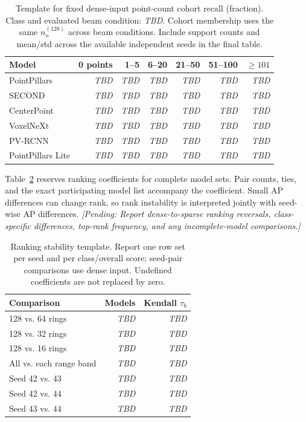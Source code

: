 \documentclass[10pt,twocolumn]{article}
\newcommand{\TBD}{\textit{TBD}}
\newcommand{\pending}[1]{\textcolor{blue!55!black}{\textit{[Pending: #1]}}}
\begin{document}
\begin{table}[t]
\centering\small
\caption{Template for fixed dense-input point-count cohort recall (fraction). Class and evaluated beam condition: \TBD. Cohort membership uses the same $n_o^{(128)}$ across beam conditions. Include support counts and mean/std across the available independent seeds in the final table.}
\label{tab:density-results}
\begin{tabular}{lrrrrrr}
\toprule
Model & 0 points & 1--5 & 6--20 & 21--50 & 51--100 & $\geq101$\\
\midrule
PointPillars & \TBD & \TBD & \TBD & \TBD & \TBD & \TBD\\
SECOND & \TBD & \TBD & \TBD & \TBD & \TBD & \TBD\\
CenterPoint & \TBD & \TBD & \TBD & \TBD & \TBD & \TBD\\
VoxelNeXt & \TBD & \TBD & \TBD & \TBD & \TBD & \TBD\\
PV-RCNN & \TBD & \TBD & \TBD & \TBD & \TBD & \TBD\\
PointPillars Lite & \TBD & \TBD & \TBD & \TBD & \TBD & \TBD\\
\bottomrule
\end{tabular}
\end{table}

Table~\ref{tab:ranking-results} reserves ranking coefficients for complete model sets. Pair counts, ties, and the exact participating model list accompany the coefficient. Small AP differences can change rank, so rank instability is interpreted jointly with seed-wise AP differences. \pending{Report dense-to-sparse ranking reversals, class-specific differences, top-rank frequency, and any incomplete-model comparisons.}

\begin{table}[t]
\centering\small
\caption{Ranking stability template. Report one row set per seed and per class/overall score; seed-pair comparisons use dense input. Undefined coefficients are not replaced by zero.}
\label{tab:ranking-results}
\begin{tabular}{lrr}
\toprule
Comparison & Models & Kendall $\tau_b$\\
\midrule
128 vs. 64 rings & \TBD & \TBD\\
128 vs. 32 rings & \TBD & \TBD\\
128 vs. 16 rings & \TBD & \TBD\\
All vs. each range band & \TBD & \TBD\\
Seed 42 vs. 43 & \TBD & \TBD\\
Seed 42 vs. 44 & \TBD & \TBD\\
Seed 43 vs. 44 & \TBD & \TBD\\
\bottomrule
\end{tabular}
\end{table}
\end{document}
